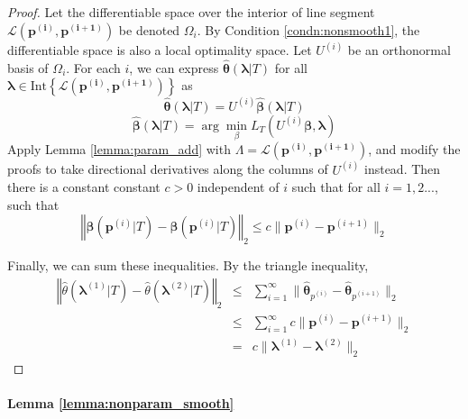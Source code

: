 \documentclass[12pt]{article}
\begin{document}
\begin{proof}
	Let the differentiable
	space over the interior of line segment $\mathcal{L}\left(\boldsymbol{p^{(i)},p^{(i+1)}}\right)$
	be denoted $\Omega_{i}$. 
	By Condition \ref{condn:nonsmooth1}, the differentiable space is also a local optimality
	space. Let $U^{(i)}$ be an orthonormal basis of $\Omega_{i}$. For
	each $i$, we can express $\hat{\boldsymbol{\theta}}(\boldsymbol{\lambda} | T)$ for
	all $\boldsymbol{\lambda}\in\mbox{Int}\left\{ \mathcal{L}\left(\boldsymbol{p^{(i)},p^{(i+1)}}\right)\right\} $
	as
	\[
	\hat{\boldsymbol{\theta}}(\boldsymbol{\lambda} | T)=U^{(i)}\hat{\boldsymbol{\beta}}(\boldsymbol{\lambda} | T)
	\]
	\[
	\hat{\boldsymbol{\beta}}(\boldsymbol{\lambda} | T)=\arg\min_{\beta}L_{T}(U^{(i)}\boldsymbol{\beta},\boldsymbol{\lambda})
	\]
	Apply Lemma \ref{lemma:param_add} with $\Lambda= \mathcal{L}\left(\boldsymbol{p^{(i)},p^{(i+1)}}\right)$, and modify the proofs to take directional derivatives
	along the columns of $U^{(i)}$ instead. Then there is a constant
	constant $c>0$ independent of $i$ such that for all $i=1,2...$,
	such that
	\[
	\left\Vert 
	\boldsymbol{\hat{\beta}}(\boldsymbol{p}^{(i)} | T)
	-\boldsymbol{\hat{\beta}}(\boldsymbol{p}^{(i)} | T)
	\right\Vert _{2}
	\le 
	c\|\boldsymbol{p}^{(i)}-\boldsymbol{p}^{(i+1)}\|_{2}
	\]
	
	
	Finally, we can sum these inequalities. By the triangle inequality,
	\begin{eqnarray*}
		\left\Vert 
		\hat{\theta}(\boldsymbol{\lambda}^{(1)} |T)
		- \hat{\theta}(\boldsymbol{\lambda}^{(2)} |T)
		\right\Vert _{2} 
		& \le & \sum_{i=1}^{\infty}\|\boldsymbol{\hat{\theta}}_{p^{(i)}}-\boldsymbol{\hat{\theta}}_{p^{(i+1)}}\|_{2}\\
		& \le & \sum_{i=1}^{\infty}
		c\|\boldsymbol{p}^{(i)}-\boldsymbol{p}^{(i+1)}\|_{2}\\
		& = & c\|\boldsymbol{\lambda}^{(1)}-\boldsymbol{\lambda}^{(2)}\|_{2}
	\end{eqnarray*}
\end{proof}

\paragraph{Lemma \ref{lemma:nonparam_smooth}}
\end{document}
